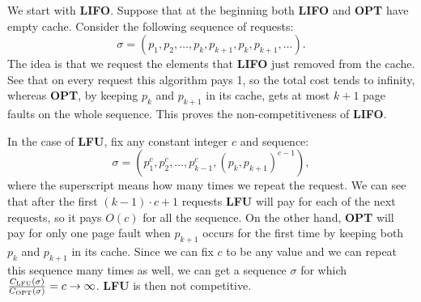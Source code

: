 We start with \textbf{LIFO}. Suppose that at the beginning both \textbf{LIFO} and \textbf{OPT} have
empty cache. Consider the following sequence of requests:
$$ \sigma = (p_1, p_2, \ldots, p_k, p_{k+1}, p_k, p_{k+1}, \ldots).$$
The idea is that we request the elements that \textbf{LIFO} just removed from the 
cache. See that on every request this algorithm pays 1, 
so the total cost tends to infinity, whereas \textbf{OPT}, by keeping $p_k$ 
and $p_{k+1}$ in its cache, gets at most $k+1$ page faults on the whole sequence. This proves the non-competitiveness of \textbf{LIFO}.

In the case of \textbf{LFU}, fix any constant integer $c$ and sequence:
$$\sigma = (p_1^c, p_2^c, \ldots, p_{k-1}^c, (p_k, p_{k+1})^{c-1}),$$
where the superscript means how many times we repeat the request. We can see that 
after the first $(k-1) \cdot c + 1$ requests \textbf{LFU} will pay for each of the 
next requests, so it pays $O(c)$ for all the sequence. On the other hand, 
\textbf{OPT} will pay for only one page fault when $p_{k+1}$ occurs for the 
first time by keeping both $p_k$ and $p_{k+1}$ in its cache. Since we can fix $c$ to be any value and we can repeat this 
sequence many times as well, we can get a sequence $\sigma$ for which 
$\frac{C_{\mathrm{LFU}}(\sigma)}{C_{\mathrm{OPT}}(\sigma)} = c \rightarrow \infty$. 
\textbf{LFU} is then not competitive.
